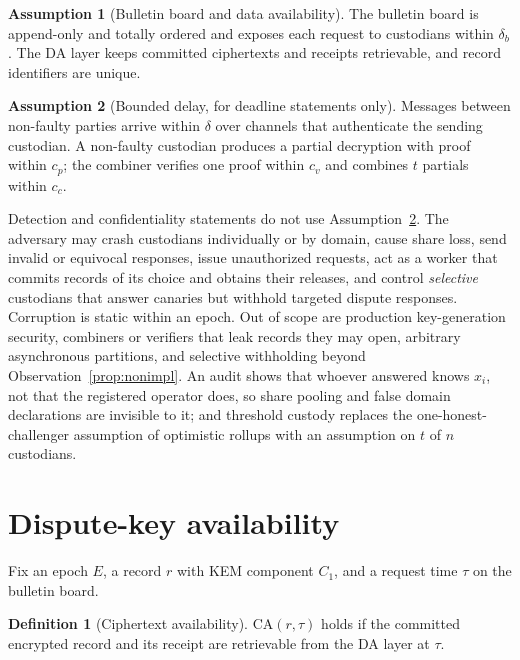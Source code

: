 \documentclass[Crown,sagev]{sagej}
\theoremstyle{plain}
\theoremstyle{definition}
\newtheorem{definition}{Definition}
\newtheorem{assumption}{Assumption}
\theoremstyle{remark}
\newcommand{\CA}{\mathrm{CA}}
\begin{document}
\begin{assumption}[Bulletin board and data availability]\label{as:board}
The bulletin board is append-only and totally ordered and exposes each request to custodians within $\delta_b$. The DA layer keeps committed ciphertexts and receipts retrievable, and record identifiers are unique.
\end{assumption}

\begin{assumption}[Bounded delay, for deadline statements only]\label{as:sync}
Messages between non-faulty parties arrive within $\delta$ over channels that authenticate the sending custodian. A non-faulty custodian produces a partial decryption with proof within $c_p$; the combiner verifies one proof within $c_v$ and combines $t$ partials within $c_c$.
\end{assumption}

Detection and confidentiality statements do not use Assumption~\ref{as:sync}. The adversary may crash custodians individually or by domain, cause share loss, send invalid or equivocal responses, issue unauthorized requests, act as a worker that commits records of its choice and obtains their releases, and control \emph{selective} custodians that answer canaries but withhold targeted dispute responses. Corruption is static within an epoch. Out of scope are production key-generation security, combiners or verifiers that leak records they may open, arbitrary asynchronous partitions, and selective withholding beyond Observation~\ref{prop:nonimpl}. An audit shows that whoever answered knows $x_i$, not that the registered operator does, so share pooling and false domain declarations are invisible to it; and threshold custody replaces the one-honest-challenger assumption of optimistic rollups with an assumption on $t$ of $n$ custodians.

\section{Dispute-key availability}\label{sec:properties}

Fix an epoch $E$, a record $r$ with KEM component $C_1$, and a request time $\tau$ on the bulletin board.

\begin{definition}[Ciphertext availability]\label{def:ca}
$\CA(r,\tau)$ holds if the committed encrypted record and its receipt are retrievable from the DA layer at $\tau$.
\end{definition}
\end{document}
